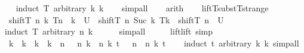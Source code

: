 \begin{isabellebody}
%
\isadelimproof
\ \ %
\endisadelimproof
%
\isatagproof
{}\isamarkupfalse%
\ {\isacharparenleft}{\kern0pt}induct\ T\ arbitrary{\isacharcolon}{\kern0pt}\ k\ k{\isacharprime}{\kern0pt}{\isacharparenright}{\kern0pt}\isanewline
\ \ \isamarkupfalse%
\ simp{\isacharunderscore}{\kern0pt}all\isanewline
\ \ \isamarkupfalse%
\ arith\isanewline
\ \ \isamarkupfalse%
%
\endisatagproof
{\isafoldproof}%
%
\isadelimproof
\isanewline
%
\endisadelimproof
\isanewline
\isanewline
\isanewline
{}\isamarkupfalse%
\ liftT{\isacharunderscore}{\kern0pt}substT{\isacharunderscore}{\kern0pt}strange{\isacharcolon}{\kern0pt}\isanewline
\ \ {\isachardoublequoteopen}shiftT\ n\ k\ T{\isacharbrackleft}{\kern0pt}n\ {\isacharplus}{\kern0pt}\ k\ {\isasymmapsto}\isactrlsub {\isasymtau}\ U{\isacharbrackright}{\kern0pt}\isactrlsub {\isasymtau}\ {\isacharequal}{\kern0pt}\ shiftT\ n\ {\isacharparenleft}{\kern0pt}Suc\ k{\isacharparenright}{\kern0pt}\ T{\isacharbrackleft}{\kern0pt}k\ {\isasymmapsto}\isactrlsub {\isasymtau}\ shiftT\ n\ {}\ U{\isacharbrackright}{\kern0pt}\isactrlsub {\isasymtau}{\isachardoublequoteclose}\isanewline
%
\isadelimproof
\ \ %
\endisadelimproof
%
\isatagproof
{}\isamarkupfalse%
\ {\isacharparenleft}{\kern0pt}induct\ T\ arbitrary{\isacharcolon}{\kern0pt}\ n\ k{\isacharparenright}{\kern0pt}\isanewline
\ \ \ \ \isamarkupfalse%
\ simp{\isacharunderscore}{\kern0pt}all\isanewline
\ \ \isamarkupfalse%
%
\endisatagproof
{\isafoldproof}%
%
\isadelimproof
\ \isanewline
%
\endisadelimproof
\isanewline
\isanewline
{}\isamarkupfalse%
\ lift{\isacharunderscore}{\kern0pt}lift\ {\isacharbrackleft}{\kern0pt}simp{\isacharbrackright}{\kern0pt}{\isacharcolon}{\kern0pt}\isanewline
\ \ {\isachardoublequoteopen}k\ {\isasymle}\ k{\isacharprime}{\kern0pt}\ {\isasymLongrightarrow}\ k{\isacharprime}{\kern0pt}\ {\isasymle}\ k\ {\isacharplus}{\kern0pt}\ n\ {\isasymLongrightarrow}\ {\isasymup}\ n{\isacharprime}{\kern0pt}\ k{\isacharprime}{\kern0pt}\ {\isacharparenleft}{\kern0pt}{\isasymup}\ n\ k\ t{\isacharparenright}{\kern0pt}\ {\isacharequal}{\kern0pt}\ {\isasymup}\ {\isacharparenleft}{\kern0pt}n\ {\isacharplus}{\kern0pt}\ n{\isacharprime}{\kern0pt}{\isacharparenright}{\kern0pt}\ k\ t{\isachardoublequoteclose}\isanewline
%
\isadelimproof
\ \ %
\endisadelimproof
%
\isatagproof
{}\isamarkupfalse%
\ {\isacharparenleft}{\kern0pt}induct\ t\ arbitrary{\isacharcolon}{\kern0pt}\ k\ k{\isacharprime}{\kern0pt}{\isacharparenright}{\kern0pt}\ simp{\isacharunderscore}{\kern0pt}all%

\end{isabellebody}
